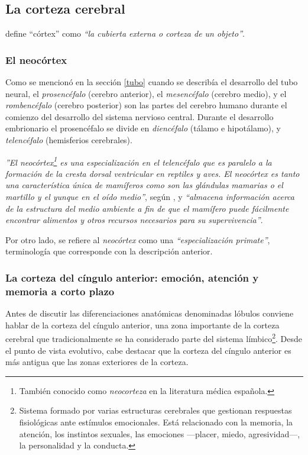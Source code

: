 \subsection{La corteza cerebral}
\label{sec::corteza-cerebral}

\cite{JohnAllman2000} define ``córtex'' como {\it ``la cubierta externa o corteza de un objeto''}.

\subsubsection{El neocórtex}
Como se mencionó en la sección \ref{tubo} cuando se describía el desarrollo del tubo neural, el {\it prosencéfalo} (cerebro anterior), el {\it mesencéfalo} (cerebro medio), y el {\it rombencéfalo} (cerebro posterior) son las partes del cerebro humano durante el comienzo del desarrollo del sistema nervioso central. Durante el desarrollo embrionario el prosencéfalo se divide en {\it diencéfalo} (tálamo e hipotálamo), y {\it telencéfalo} (hemisferios cerebrales).

{\it ''El neocórtex\footnote{También conocido como {\it neocorteza} en la literatura médica española.} es una especialización en el telencéfalo que es paralelo a la formación de la cresta dorsal ventricular en reptiles y aves. El neocórtex es tanto una característica única de mamíferos como son las glándulas mamarias o el martillo y el yunque en el oído medio''}, según \cite{JohnAllman2000}, y {\it ``almacena información acerca de la estructura del medio ambiente a fin de que el mamífero puede fácilmente encontrar alimentos y otros recursos necesarios para su supervivencia''}.

Por otro lado, \cite{Sapolsky} se refiere al {\it neocórtex} como una {\it ``especialización primate''}, terminología que corresponde con la descripción anterior.

\subsubsection{La corteza del cíngulo anterior: emoción, atención y memoria a corto plazo}

Antes de discutir las diferenciaciones anatómicas denominadas lóbulos conviene hablar de la corteza del cíngulo anterior, una zona importante de la corteza cerebral que tradicionalmente se ha considerado parte del sistema límbico\footnote{Sistema formado por varias estructuras cerebrales que gestionan respuestas fisiológicas ante estímulos emocionales. Está relacionado con la memoria, la atención, los instintos sexuales, las emociones ---placer, miedo, agresividad---, la personalidad y la conducta.}. Desde el punto de vista evolutivo, cabe destacar que la corteza del cíngulo anterior es más antigua que las zonas exteriores de la corteza.


